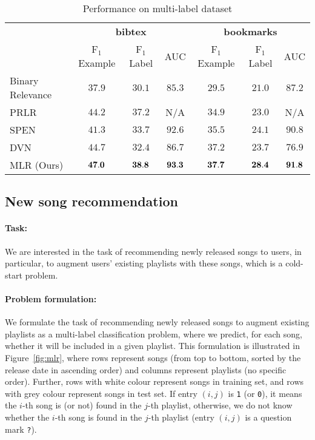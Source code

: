 \begin{table}[!h]
\centering
\caption{Performance on multi-label dataset}
\label{tab:perf_mlc}
\setlength{\tabcolsep}{2pt} %
\begin{tabular}{l|ccc|ccc}
\toprule
{} & \multicolumn{3}{c|}{\textbf{bibtex}} & \multicolumn{3}{c}{\textbf{bookmarks}} \\
{} &   F$_1$ Example & F$_1$ Label &    AUC &      F$_1$ Example & F$_1$ Label &    AUC \\
\midrule
Binary Relevance~\cite{}           &          $37.9$ &      $30.1$ & $85.3$ &             $29.5$ &      $21.0$ & $87.2$ \\
PRLR~\cite{lin2014multi}           &          $44.2$ &      $37.2$ &    N/A &             $34.9$ &      $23.0$ &    N/A \\
SPEN~\cite{belanger2016structured} &          $41.3$ &      $33.7$ & $92.6$ &             $35.5$ &      $24.1$ & $90.8$ \\
DVN~\cite{gygli2017deep}           &          $44.7$ &      $32.4$ & $86.7$ &             $37.2$ &      $23.7$ & $76.9$ \\
MLR (Ours)                         &          ${\bf 47.0}$ & ${\bf 38.8}$ & ${\bf 93.3}$ & ${\bf 37.7}$ & ${\bf 28.4}$ & ${\bf 91.8}$ \\
\bottomrule
\end{tabular}
\end{table}



\subsection{New song recommendation}

\paragraph{Task:} 
We are interested in the task of recommending newly released songs to users,
in particular, to augment users' existing playlists with these songs,
which is a cold-start problem.

\paragraph{Problem formulation:}
We formulate the task of recommending newly released songs to augment existing playlists
as a multi-label classification problem, where we predict, for each song, 
whether it will be included in a given playlist.
This formulation is illustrated in Figure~\ref{fig:mlr},
where rows represent songs (from top to bottom, sorted by the release date in ascending order)
and columns represent playlists (no specific order).
Further, rows with white colour represent songs in training set, and rows with grey colour represent songs in test set.
If entry $(i, j)$ is \texttt{1} (or \texttt{0}), it means the $i$-th song is (or not) found in the $j$-th playlist,
otherwise, we do not know whether the $i$-th song is found in the $j$-th playlist (\ie entry $(i, j)$ is a question mark \texttt{?}).


